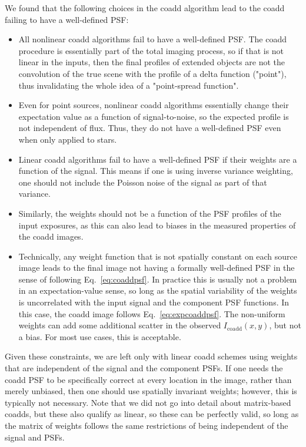 \documentclass[modern]{style_and_logos/lsstdescnote}
\begin{document}
We found that the following choices in the coadd algorithm lead to the coadd failing to
have a well-defined PSF:
\begin{itemize}
    \item All nonlinear coadd algorithms fail to have a well-defined PSF.  The coadd procedure is essentially part of the total imaging process, so if that is not linear in the inputs, then the final profiles of extended objects are not the convolution of the true scene with the profile of a delta function ("point"), thus invalidating the whole idea of a "point-spread function".
    \item Even for point sources, nonlinear coadd algorithms essentially change their expectation value as a function of signal-to-noise, so the expected profile is not independent of flux.  Thus, they do not have a well-defined PSF even when only applied to stars.
    \item Linear coadd algorithms fail to have a well-defined PSF if their weights are a function of the signal.  This means if one is using inverse variance weighting, one should not include the Poisson noise of the signal as part of that variance.
    \item Similarly, the weights should not be a function of the PSF profiles of the input exposures, as this can also lead to biases in the measured properties of the coadd images.
    \item Technically, any weight function that is not spatially constant on each source image leads to the final image not having a formally well-defined PSF in the sense of following Eq.~\eqref{eq:coaddpsf}.  In practice this is usually not a problem in an expectation-value sense, so long as the spatial variability of the weights is uncorrelated with the input signal and the component PSF functions.  In this case, the coadd image follows Eq.~\eqref{eq:expcoaddpsf}. The non-uniform weights can add some additional scatter in the observed $I_\mathrm{coadd}(x,y)$, but not a bias.  For most use cases, this is acceptable.
\end{itemize}

Given these constraints, we are left only with linear coadd schemes using weights that are independent of the signal and the component PSFs.  If one needs the coadd PSF to be specifically correct at every location in the image, rather than merely unbiased, then one should use spatially invariant weights; however, this is typically not necessary. Note that we did not go into detail about matrix-based coadds, but these also qualify as linear, so these can be perfectly valid, so long as the matrix of weights follows the same restrictions of being independent of the signal and PSFs.


  
\end{document}
